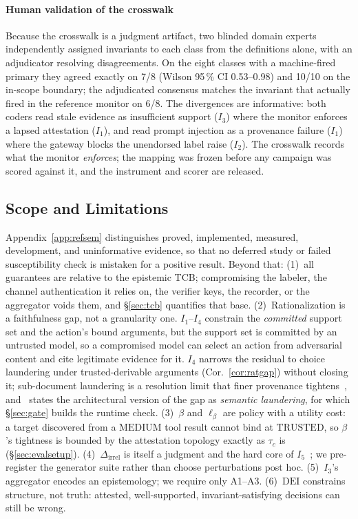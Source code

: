 \documentclass[conference,compsoc]{IEEEtran}
\theoremstyle{definition}
\theoremstyle{plain}
\newcommand{\Ione}{\ensuremath{I_1}}
\newcommand{\Itwo}{\ensuremath{I_2}}
\newcommand{\Ithree}{\ensuremath{I_3}}
\newcommand{\Ifour}{\ensuremath{I_4}}
\newcommand{\Ifive}{\ensuremath{I_5}}
\providecommand{\tc}{\tau_{c}}
\newcommand{\bindpol}{\ensuremath{\beta}}
\newcommand{\Dirrel}{\ensuremath{\Delta_{\mathrm{irrel}}}}
\newcommand{\DEI}{\ensuremath{\mathrm{DEI}}}
\begin{document}
\paragraph*{Human validation of the crosswalk}
Because the crosswalk is a judgment artifact, two blinded domain
experts independently assigned invariants to each class from the
definitions alone, with an adjudicator resolving disagreements. On the
eight classes with a machine-fired primary they agreed exactly on 7/8
(Wilson 95\,\% CI 0.53--0.98) and 10/10 on the in-scope boundary; the
adjudicated consensus matches the invariant that actually fired in the
reference monitor on 6/8. The divergences are informative: both coders
read stale evidence as insufficient support (\Ithree) where the monitor
enforces a lapsed attestation (\Ione), and read prompt injection as a
provenance failure (\Ione) where the gateway blocks the unendorsed
label raise (\Itwo). The crosswalk records what the monitor
\emph{enforces}; the mapping was frozen before any campaign was scored
against it, and the instrument and scorer are released.

\subsection{Scope and Limitations}
\label{sec:limitations}
Appendix~\ref{app:refsem} distinguishes proved, implemented, measured,
development, and uninformative evidence, so that no deferred study or
failed susceptibility check is mistaken for a positive result. Beyond
that: (1)~all guarantees are relative to the epistemic TCB; compromising
the labeler, the channel authentication it relies on, the verifier
keys, the recorder, or the aggregator voids them, and \S\ref{sec:tcb}
quantifies that base. (2)~Rationalization is a faithfulness gap, not a
granularity one. \Ione--\Ifour{} constrain the \emph{committed} support
set and the action's bound arguments, but the support set is committed
by an untrusted model, so a compromised model can select an action from
adversarial content and cite legitimate evidence for it. \Ifour{}
narrows the residual to choice laundering under trusted-derivable
arguments (Cor.~\ref{cor:ratgap}) without closing it; sub-document
laundering is a resolution limit that finer provenance
tightens~\cite{argus,cxi}, and~\cite{romanchuk2026semantic} states the
architectural version of the gap as \emph{semantic laundering}, for
which \S\ref{sec:gate} builds the runtime check. (3)~$\bindpol$ and
$\ell_{\bindpol}$ are policy with a utility cost: a target discovered
from a $\mathrm{MEDIUM}$ tool result cannot bind at $\mathrm{TRUSTED}$,
so $\bindpol$'s tightness is bounded by the attestation topology
exactly as $\tc$ is (\S\ref{sec:evalsetup}). (4)~$\Dirrel$ is itself a judgment
and the hard core of \Ifive~\cite{qu}; we pre-register the generator
suite rather than choose perturbations post hoc. (5)~\Ithree's
aggregator encodes an epistemology; we require only A1--A3.
(6)~\DEI{} constrains structure, not truth: attested, well-supported,
invariant-satisfying decisions can still be wrong.
\end{document}
